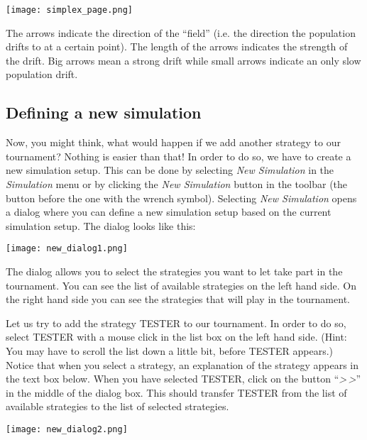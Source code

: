 \documentclass[12pt,a4paper,USenglish]{article}
\begin{document}
\begin{center}\texttt{[image: simplex\_page.png]}\end{center}

The arrows indicate the direction of the ``field'' (i.e. the direction
the population drifts to at a certain point). The length of the arrows
indicates the strength of the drift. Big arrows mean a strong drift
while small arrows indicate an only slow population drift.


\subsection{Defining a new simulation}

Now, you might think, what would happen if we add another strategy to
our tournament? Nothing is easier than that! In order to do so, we have
to create a new simulation setup. This can be done by selecting
\emph{New Simulation} in the
\emph{Simulation} menu or by clicking the \emph{New Simulation} button
in the toolbar (the button before the one with the wrench symbol).
Selecting \emph{New Simulation} opens a dialog where you can define a
new simulation setup based on the current simulation setup. The dialog
looks like this:

\begin{center}\texttt{[image: new\_dialog1.png]}\end{center}

The dialog allows you to select the strategies you want to let take
part in the tournament. You can see the list of available strategies
on the left hand side. On the right hand side you can see the strategies
that will play in the tournament. 

Let us try to add the strategy TESTER to our tournament. In order to
do so, select TESTER with a mouse click in the list box on the left
hand side. (Hint: You may have to scroll the list down a little bit,
before TESTER appears.) Notice that when you select a strategy, an
explanation of the strategy appears in the text box below. When you
have selected TESTER, click on the button ``\emph{>\,>}'' in the middle of
the dialog box. This should transfer TESTER from the list of available
strategies to the list of selected strategies.

\begin{center}\texttt{[image: new\_dialog2.png]}\end{center}
\end{document}
